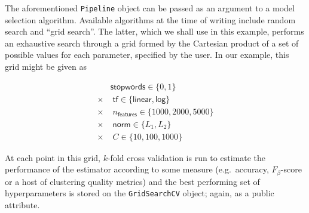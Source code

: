The aforementioned \texttt{Pipeline} object
can be passed as an argument to a model selection algorithm.
Available algorithms at the time of writing include random search
\citep{bergstra2012} and ``grid search''.
The latter, which we shall use in this example,
performs an exhaustive search through a grid formed by the Cartesian product
of a set of possible values for each parameter, specified by the user.
In our example, this grid might be given as

\begin{align*}
         & \textsf{stopwords} \in \{0, 1\}                      \\
  \times & \; \textsf{tf} \in \{\textsf{linear}, \textsf{log}\} \\
  \times & \; n_\textsf{features} \in \{1000, 2000, 5000\}      \\
  \times & \; \textsf{norm} \in \{L_1, L_2\}                    \\
  \times & \; C \in \{10, 100, 1000\}
\end{align*}

At each point in this grid, $k$-fold cross validation is run
to estimate the performance of the estimator according to some measure
(e.g.\ accuracy, $F_\beta$-score or a host of clustering quality metrics)
and the best performing set of hyperparameters is stored
on the \texttt{GridSearchCV} object; again, as a public attribute.

